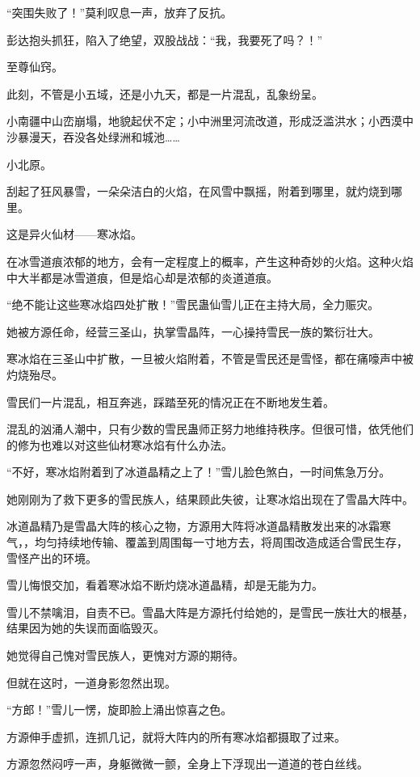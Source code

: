 \begin{this_body}
“突围失败了！”莫利叹息一声，放弃了反抗。

彭达抱头抓狂，陷入了绝望，双股战战：“我，我要死了吗？！”

至尊仙窍。

此刻，不管是小五域，还是小九天，都是一片混乱，乱象纷呈。

小南疆中山峦崩塌，地貌起伏不定；小中洲里河流改道，形成泛滥洪水；小西漠中沙暴漫天，吞没各处绿洲和城池……

小北原。

刮起了狂风暴雪，一朵朵洁白的火焰，在风雪中飘摇，附着到哪里，就灼烧到哪里。

这是异火仙材——寒冰焰。

在冰雪道痕浓郁的地方，会有一定程度上的概率，产生这种奇妙的火焰。这种火焰中大半都是冰雪道痕，但是焰心却是浓郁的炎道道痕。

“绝不能让这些寒冰焰四处扩散！”雪民蛊仙雪儿正在主持大局，全力赈灾。

她被方源任命，经营三圣山，执掌雪晶阵，一心操持雪民一族的繁衍壮大。

寒冰焰在三圣山中扩散，一旦被火焰附着，不管是雪民还是雪怪，都在痛嚎声中被灼烧殆尽。

雪民们一片混乱，相互奔逃，踩踏至死的情况正在不断地发生着。

混乱的汹涌人潮中，只有少数的雪民蛊师正努力地维持秩序。但很可惜，依凭他们的修为也难以对这些仙材寒冰焰有什么办法。

“不好，寒冰焰附着到了冰道晶精之上了！”雪儿脸色煞白，一时间焦急万分。

她刚刚为了救下更多的雪民族人，结果顾此失彼，让寒冰焰出现在了雪晶大阵中。

冰道晶精乃是雪晶大阵的核心之物，方源用大阵将冰道晶精散发出来的冰霜寒气，，均匀持续地传输、覆盖到周围每一寸地方去，将周围改造成适合雪民生存，雪怪产出的环境。

雪儿悔恨交加，看着寒冰焰不断灼烧冰道晶精，却是无能为力。

雪儿不禁噙泪，自责不已。雪晶大阵是方源托付给她的，是雪民一族壮大的根基，结果因为她的失误而面临毁灭。

她觉得自己愧对雪民族人，更愧对方源的期待。

但就在这时，一道身影忽然出现。

“方郎！”雪儿一愣，旋即脸上涌出惊喜之色。

方源伸手虚抓，连抓几记，就将大阵内的所有寒冰焰都摄取了过来。

方源忽然闷哼一声，身躯微微一颤，全身上下浮现出一道道的苍白丝线。


\end{this_body}
